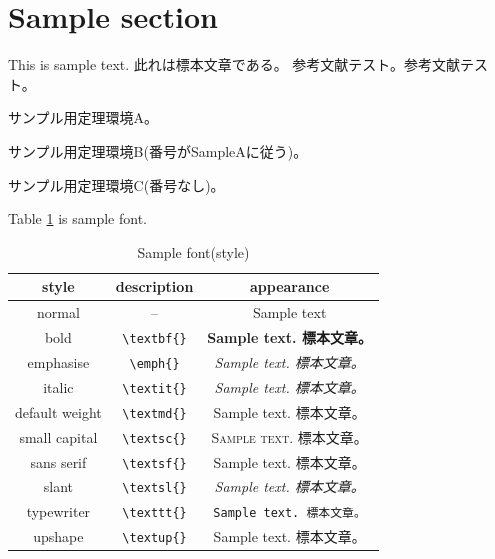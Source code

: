 \section{Sample section}
This is sample text.
此れは標本文章である。
参考文献テスト\cite{Sample2000}。参考文献テスト\cite{discovery, Laskar}。

\begin{SampleA}
    サンプル用定理環境A。
\end{SampleA}
\begin{SampleB}
    サンプル用定理環境B(番号がSampleAに従う)。
\end{SampleB}
\begin{SampleC}
    サンプル用定理環境C(番号なし)。
\end{SampleC}

Table \ref{sample_font} is sample font.
\begin{table}
    \centering
    \caption{Sample font(style)}
    \begin{tabular}{|c|c|c|}
        \hline
        style & description & appearance \\ \hline
        normal & -- & Sample text \\ \hline
        bold & \texttt{\textbackslash textbf\{\}} & \textbf{Sample text. 標本文章。} \\ \hline
        emphasise & \texttt{\textbackslash emph\{\}} & \emph{Sample text. 標本文章。} \\ \hline
        italic & \texttt{\textbackslash textit\{\}} & \textit{Sample text. 標本文章。} \\ \hline
        default weight & \texttt{\textbackslash textmd\{\}} & \textmd{Sample text. 標本文章。} \\ \hline
        small capital & \texttt{\textbackslash textsc\{\}} & \textsc{Sample text. 標本文章。} \\ \hline
        sans serif & \texttt{\textbackslash textsf\{\}} & \textsf{Sample text. 標本文章。} \\ \hline
        slant & \texttt{\textbackslash textsl\{\}} & \textsl{Sample text. 標本文章。} \\ \hline
        typewriter & \texttt{\textbackslash texttt\{\}} & \texttt{Sample text. 標本文章。} \\ \hline
        upshape & \texttt{\textbackslash textup\{\}} & \textup{Sample text. 標本文章。} \\ \hline
    \end{tabular}
    \label{sample_font}
\end{table}

